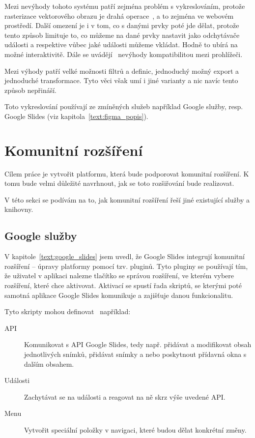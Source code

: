 Mezi nevýhody tohoto systému patří zejména problém s vykreslováním, protože rasterizace vektorového obrazu je drahá operace~\cite{svg_css_html}, a to zejména ve webovém prostředí.
Další omezení je i v tom, co s danými prvky poté jde dělat, protože tento způsob limituje to, co můžeme na dané prvky nastavit jako odchytávače události a respektive vůbec jaké události můžeme vkládat.
Hodně to ubírá na možné interaktivitě.
Dále se uvádějí~\cite{svg_css_html} nevýhody kompatibilitou mezi prohlížeči.

Mezi výhody patří velké možnosti filtrů a definic, jednoduchý možný export a jednoduché transformace.
Tyto věci však umí i jiné varianty a nic navíc tento způsob nepřináší.

Toto vykreslování používají ze zmíněných služeb například Google služby, resp. Google Slides (viz kapitola~\ref{text:figma_popis}).

\section{Komunitní rozšíření}\label{text:community_plugins}

Cílem práce je vytvořit platformu, která bude podporovat komunitní rozšíření.
K tomu bude velmi důležité navrhnout, jak se toto rozšiřování bude realizovat.

V této sekci se podívám na to, jak komunitní rozšíření řeší jiné existující služby a knihovny.

\subsection{Google služby}

V kapitole~\ref{text:google_slides} jsem uvedl, že Google Slides integrují komunitní rozšíření -- úpravy platformy pomocí tzv. pluginů.
Tyto pluginy se používají tím, že uživatel v aplikaci nalezne tlačítko se správou rozšíření, ve kterém vybere rozšíření, které chce aktivovat.
Aktivací se spustí řada skriptů, se kterými poté samotná aplikace Google Slides komunikuje a zajišťuje danou funkcionalitu.

Tyto skripty mohou definovat~\cite{google_apps} například:

\begin{description}
    \item[API] Komunikovat s API Google Slides, tedy např. přidávat a modifikovat obsah jednotlivých snímků, přidávat snímky a nebo poskytnout přídavná okna s dalším obsahem.
    \item[Události] Zachytávat se na události a reagovat na ně skrz výše uvedené API.
    \item[Menu] Vytvořit speciální položky v navigaci, které budou dělat konkrétní změny.
\end{description}


